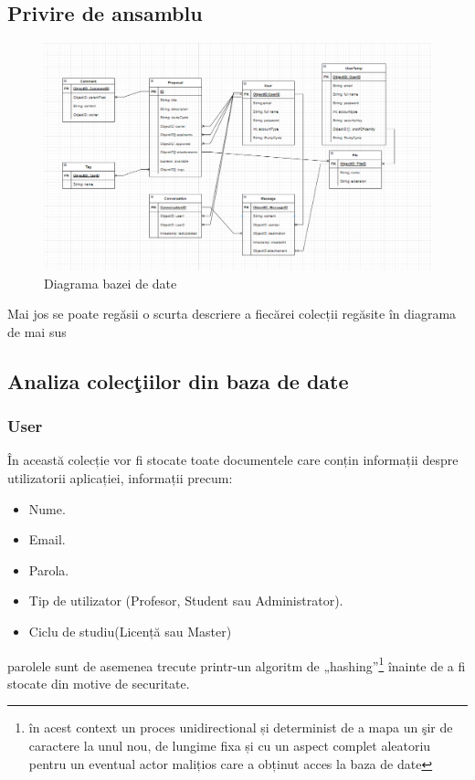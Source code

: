 \documentclass[12pt,a4paper,hidelinks]{report}
\theoremstyle{definition}
\theoremstyle{remark}
\begin{document}
\subsection{Privire de ansamblu}
\begin{figure}[H]
    \centering
    \includegraphics[scale=0.4]{images/DB_Diagram.png}
    \caption{Diagrama bazei de date}
\end{figure}
Mai jos se poate regăsii o scurta descriere a fiecărei colecții regăsite în diagrama de mai sus
\subsection{Analiza colec\c tiilor din baza de date}
\subsubsection{User}
În această colecție vor fi stocate toate documentele care conțin informații despre utilizatorii aplicației, informații precum:
\begin{itemize}
    \item Nume.
    \item Email.
    \item Parola.
    \item Tip de utilizator (Profesor, Student sau Administrator).
    \item Ciclu de studiu(Licență sau Master)    
\end{itemize}
parolele sunt de asemenea trecute printr-un algoritm de „hashing”\footnote[1]{ în acest context un proces unidirectional și determinist de a mapa un \c sir de caractere la unul nou, de lungime fixa și cu un aspect complet aleatoriu pentru un eventual actor malițios care a obținut acces la baza de date} înainte de a fi stocate din motive de securitate.
\end{document}
